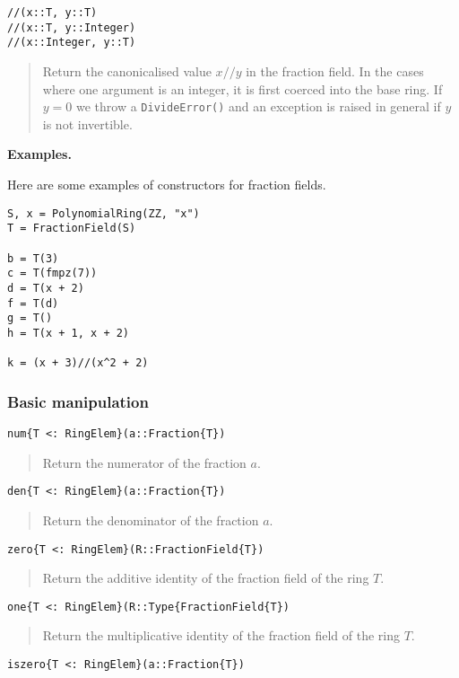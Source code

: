 \documentclass[a4paper,10pt]{article}
\newcommand{\code}{\lstinline}
\newcommand{\desc}[1]{\vspace{-3mm}\begin{quote}#1\end{quote}}
\begin{document}
\begin{lstlisting}
//(x::T, y::T)
//(x::T, y::Integer)
//(x::Integer, y::T)
\end{lstlisting}

\desc{Return the canonicalised value $x//y$ in the fraction field. In the cases
where one argument is an integer, it is first coerced into the base ring. If
$y = 0$ we throw a \code{DivideError()} and an exception is raised in general
if $y$ is not invertible.}

\textbf{Examples.}

Here are some examples of constructors for fraction fields.

\begin{lstlisting}
S, x = PolynomialRing(ZZ, "x")
T = FractionField(S)

b = T(3)
c = T(fmpz(7))
d = T(x + 2)
f = T(d)
g = T()
h = T(x + 1, x + 2)

k = (x + 3)//(x^2 + 2)
\end{lstlisting}

\subsubsection{Basic manipulation}

\begin{lstlisting}
num{T <: RingElem}(a::Fraction{T})
\end{lstlisting}

\desc{Return the numerator of the fraction $a$.}

\begin{lstlisting}
den{T <: RingElem}(a::Fraction{T})
\end{lstlisting}

\desc{Return the denominator of the fraction $a$.}

\begin{lstlisting}
zero{T <: RingElem}(R::FractionField{T})
\end{lstlisting}

\desc{Return the additive identity of the fraction field of the ring $T$.}

\begin{lstlisting}
one{T <: RingElem}(R::Type{FractionField{T})
\end{lstlisting}

\desc{Return the multiplicative identity of the fraction field of the ring 
$T$.}

\begin{lstlisting}
iszero{T <: RingElem}(a::Fraction{T})
\end{lstlisting}
\end{document}

